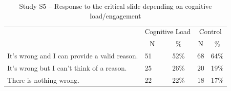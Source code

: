 \documentclass[
  american,
  man,floatsintext]{apa7}
\begin{document}
\begin{table}[tbp]

\begin{center}
\begin{threeparttable}

\caption{\label{tab:tabS5tab1dumb1all}Study S5 – Response to the critical slide depending on cognitive load/engagement}

\begin{tabular}{llccc}
\toprule
 & \multicolumn{2}{c}{Cognitive Load} & \multicolumn{2}{c}{Control} \\
\cmidrule(r){2-3} \cmidrule(r){4-5}
 & \multicolumn{1}{c}{N} & \multicolumn{1}{c}{\%} & \multicolumn{1}{c}{N} & \multicolumn{1}{c}{\%}\\
\midrule
It's wrong and I can provide a valid reason. & 51 & 52\% & 68 & 64\%\\
It's wrong but I can't think of a reason. & 25 & 26\% & 20 & 19\%\\
There is nothing wrong. & 22 & 22\% & 18 & 17\%\\
\bottomrule
\end{tabular}

\end{threeparttable}
\end{center}

\end{table}
\end{document}
